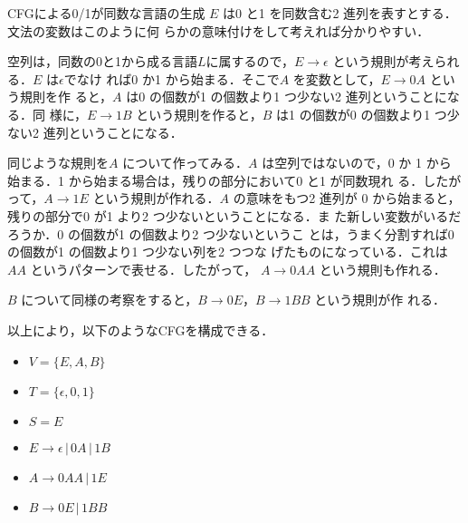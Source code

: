 \begin{myexample}{CFGによる0/1が同数な言語の生成} \footnotemark
 $E$ は0 と1 を同数含む2 進列を表すとする．文法の変数はこのように何
らかの意味付けをして考えれば分かりやすい．
 
空列は，同数の0と1から成る言語$L$に属するので，$E \rightarrow \epsilon$  という規則が考えられる．$E$ は$\epsilon$でなけ
れば0 か1 から始まる．そこで$A$ を変数として，$E \rightarrow 0A$ という規則を作
ると，$A$ は0 の個数が1 の個数より1 つ少ない2 進列ということになる．同
様に，$E \rightarrow 1B$ という規則を作ると，$B$ は1 の個数が0 の個数より1 つ少
ない2 進列ということになる．
 
同じような規則を$A$ について作ってみる．$A$ は空列ではないので，0 か
1 から始まる．1 から始まる場合は，残りの部分において0 と1 が同数現れ
る．したがって，$A \rightarrow 1E$ という規則が作れる．$A$ の意味をもつ2 進列が
0 から始まると，残りの部分で0 が1 より2 つ少ないということになる．ま
た新しい変数がいるだろうか．0 の個数が1 の個数より2 つ少ないというこ
とは，うまく分割すれば0 の個数が1 の個数より1 つ少ない列を2 つつな
げたものになっている．これは$AA$ というパターンで表せる．したがって，
$A \rightarrow 0AA$ という規則も作れる．

$B$ について同様の考察をすると，$B \rightarrow 0E， B \rightarrow 1BB$ という規則が作
れる． 

 以上により，以下のようなCFGを構成できる．
 \begin{itemize}
  \item $V = \{E, A, B\}$
  \item $T = \{\epsilon, 0, 1\}$
  \item $S = E$
  \item $E \rightarrow \epsilon \, | \, 0A \, | \, 1B$
  \item $A \rightarrow 0AA \, | \, 1E$
  \item $B \rightarrow 0E \, | \, 1BB$
 \end{itemize}
\end{myexample}


